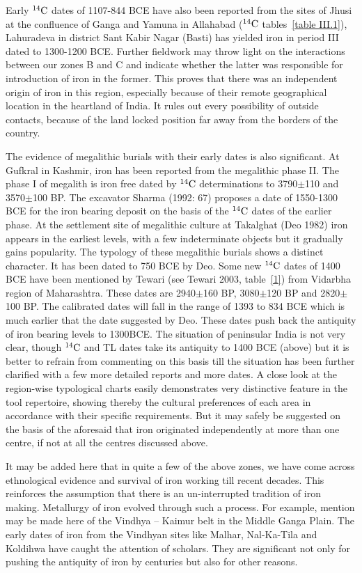 Early $^{14}{\rm C}$ dates of 1107-844 BCE have also been reported from the sites of Jhusi at the confluence of Ganga and Yamuna in Allahabad ($^{14}{\rm C}$ tables~\ref{table III.1}), Lahuradeva in district Sant Kabir Nagar (Basti) has yielded iron in period III dated to 1300-1200 BCE. Further fieldwork may throw light on the interactions between our zones B and C and indicate whether the latter was responsible for introduction of iron in the former. This proves that there was an independent origin of iron in this region, especially because of their remote geographical location in the heartland of India. It rules out every possibility of outside contacts, because of the land locked position far away from the borders of the country.

The evidence of megalithic burials with their early dates is also significant. At Gufkral in Kashmir, iron has been reported from the megalithic phase II. The phase I of megalith is iron free dated by $^{14}{\rm C}$ determinations to 3790$\pm$110 and 3570$\pm$100 BP. The excavator Sharma (1992: 67) proposes a date of 1550-1300 BCE for the iron bearing deposit on the basis of the $^{14}{\rm C}$ dates of the earlier phase. At the settlement site of megalithic culture at Takalghat (Deo 1982) iron appears in the earliest levels, with a few indeterminate objects but it gradually gains popularity. The typology of these megalithic burials shows a distinct character. It has been dated to 750 BCE by Deo. Some new $^{14}{\rm C}$ dates of 1400 BCE have been mentioned by Tewari (see Tewari 2003, table~\ref{1}) from Vidarbha region of Maharashtra. These dates are 2940$\pm$160 BP, 3080$\pm$120 BP and 2820$\pm$100 BP. The calibrated dates will fall in the range of 1393 to 834 BCE which is much earlier that the date suggested by Deo. These dates push back the antiquity of iron bearing levels to 1300BCE. The situation of peninsular India is not very clear, though $^{14}{\rm C}$ and TL dates take its antiquity to 1400 BCE (above) but it is better to refrain from commenting on this basis till the situation has been further clarified with a few more detailed reports and more dates. A close look at the region-wise typological charts easily demonstrates very distinctive feature in the tool repertoire, showing thereby the cultural preferences of each area in accordance with their specific requirements. But it may safely be suggested on the basis of the aforesaid that iron originated independently at more than one centre, if not at all the centres discussed above.

It may be added here that in quite a few of the above zones, we have come across ethnological evidence and survival of iron working till recent decades. This reinforces the assumption that there is an un-interrupted tradition of iron making. Metallurgy of iron evolved through such a process. For example, mention may be made here of the Vindhya – Kaimur belt in the Middle Ganga Plain. The early dates of iron from the Vindhyan sites like Malhar, Nal-Ka-Tila and Koldihwa have caught the attention of scholars. They are significant not only for pushing the antiquity of iron by centuries but also for other reasons.

